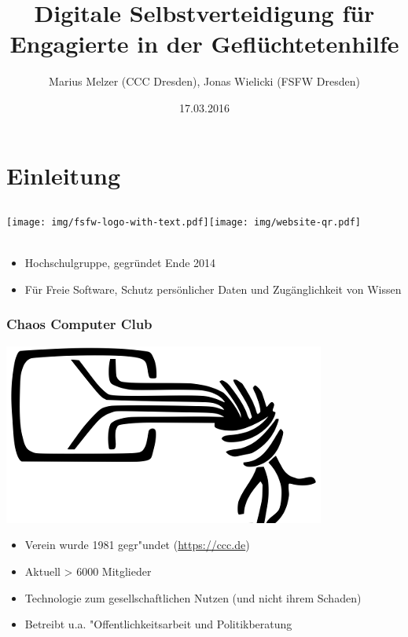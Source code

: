 \documentclass[12pt, xcolor={svgnames,table}]{beamer}
\title{Digitale Selbstverteidigung für Engagierte in der Geflüchtetenhilfe}
\author{\small Marius Melzer (CCC Dresden), Jonas Wielicki (FSFW Dresden)}
\date{17.03.2016}
\begin{document}
\maketitle

\section{Einleitung}
\subsection{}

\begin{frame}
  \begin{center}%
    \texttt{[image: img/fsfw-logo-with-text.pdf]}\hspace{1cm}\texttt{[image: img/website-qr.pdf]}\\%
    \vspace*{-1em}{Freie Software Freies Wissen}\\[1em]
  \end{center}
  \begin{itemize}
    \item Hochschulgruppe, gegründet Ende 2014
    \item Für Freie Software, Schutz persönlicher Daten und Zugänglichkeit
      von Wissen
  \end{itemize}
\end{frame}

\begin{frame}
    \frametitle{Chaos Computer Club}
    \begin{center}
	\includegraphics[height=0.2\textheight]{img/chaosknoten.png}
    \end{center}	
    \begin{itemize}
      \item<1-> Verein wurde 1981 gegr"undet (\url{https://ccc.de})
      \item<2-> Aktuell > 6000 Mitglieder
      \item<3-> Technologie zum gesellschaftlichen Nutzen (und nicht ihrem Schaden)
      \item<4-> Betreibt u.a. "Offentlichkeitsarbeit und Politikberatung
    \end{itemize}
\end{frame}
\end{document}
